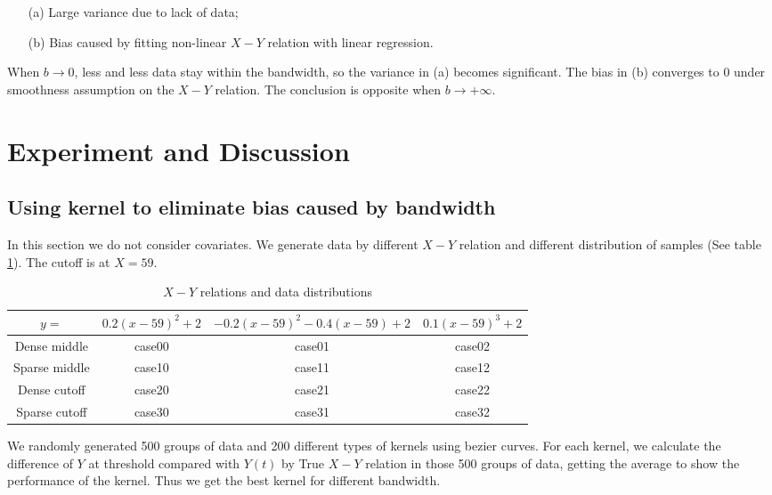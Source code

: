 \documentclass[a4 paper,12pt]{article}
\begin{document}
\begin{enumerate}
   \item[(a)] Large variance due to lack of data;
   \item[(b)] Bias caused by fitting non-linear $X-Y$ relation with linear regression.
\end{enumerate}

When $b\to 0$, less and less data stay within the bandwidth, so the variance in (a) becomes significant. The bias in (b) converges to $0$ under smoothness assumption on the $X-Y$ relation. The conclusion is opposite when $b\to+\infty$.


\section{Experiment and Discussion}

\subsection{Using kernel to eliminate bias caused by bandwidth}

In this section we do not consider covariates. We generate data by different $X-Y$ relation and different distribution of samples (See table \ref{table:kernels_test}). The cutoff is at $X=59$.

\begin{table}[h]
	\centering
   \begin{tabular}{|c|c|c|c|}
      \hline
      $y=$&$0.2(x-59)^2+2$&$-0.2(x-59)^2-0.4(x-59)+2$&$0.1(x-59)^3+2$\\
      \hline
      Dense middle&case00&case01&case02\\
      \hline
      Sparse middle&case10&case11&case12\\
      \hline
      Dense cutoff&case20&case21&case22\\
      \hline
      Sparse cutoff&case30&case31&case32\\
      \hline
   \end{tabular}
   \caption{$X-Y$ relations and data distributions}
   \label{table:kernels_test}
\end{table}

We randomly generated 500 groups of data and 200 different types of kernels using bezier curves. For each kernel, we calculate the difference of $Y$ at threshold compared with $Y(t)$ by True $X-Y$ relation in those 500 groups of data, getting the average to show the performance of the kernel. Thus we get the best kernel for different bandwidth.
\end{document}
